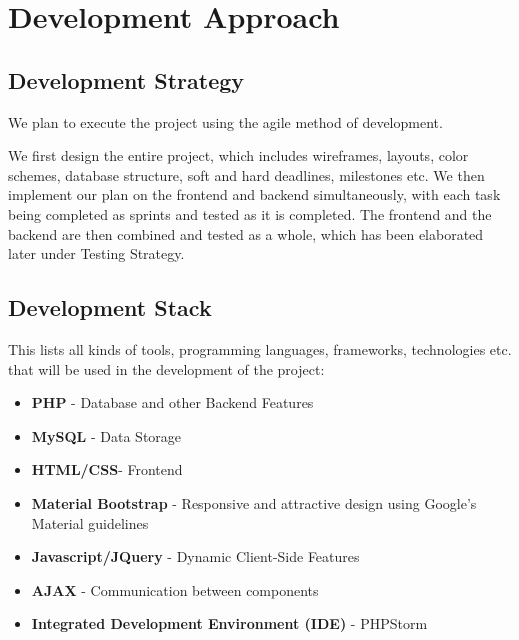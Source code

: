\documentclass[12pt]{article}
\begin{document}
\begin{table}[ht!]
\begin{tabular}{|p{2.5cm}|p{12cm}|}
    \end{tabular}
    \label{tab:nfr}
\end{table}

\section{Development Approach}

\subsection{Development Strategy}

We plan to execute the project using the agile method of development.

We first design the entire project, which includes wireframes, layouts, color schemes, database structure, soft and hard deadlines, milestones etc. We then implement our plan on the frontend and backend simultaneously, with each task being completed as sprints and tested as it is completed. The frontend and the backend are then combined and tested as a whole, which has been elaborated later under Testing Strategy.

\subsection{Development Stack}


This lists all kinds of tools, programming languages, frameworks, technologies etc. that will be used in the development of the project:


\begin{itemize}
    
    \item \textbf{PHP} - Database and other Backend Features

    \item \textbf{MySQL} - Data Storage
    
    \item \textbf{HTML/CSS}- Frontend
    
    \item \textbf{Material Bootstrap} - Responsive and attractive design using Google's Material guidelines
    
    \item \textbf{Javascript/JQuery} - Dynamic Client-Side Features
    
    \item \textbf{AJAX} - Communication between components
    
    \item \textbf{Integrated Development Environment (IDE)} - PHPStorm

\end{itemize}
\end{document}
